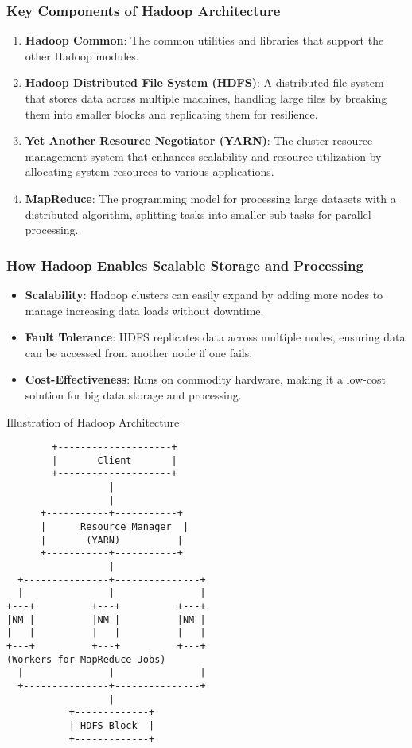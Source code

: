 \documentclass[aspectratio=169]{beamer}
\begin{document}
\begin{frame}[fragile]
    \frametitle{Key Components of Hadoop Architecture}
    \begin{enumerate}
        \item \textbf{Hadoop Common}: The common utilities and libraries that support the other Hadoop modules.
        \item \textbf{Hadoop Distributed File System (HDFS)}: A distributed file system that stores data across multiple machines, handling large files by breaking them into smaller blocks and replicating them for resilience.
        \item \textbf{Yet Another Resource Negotiator (YARN)}: The cluster resource management system that enhances scalability and resource utilization by allocating system resources to various applications.
        \item \textbf{MapReduce}: The programming model for processing large datasets with a distributed algorithm, splitting tasks into smaller sub-tasks for parallel processing.
    \end{enumerate}
\end{frame}

\begin{frame}[fragile]
    \frametitle{How Hadoop Enables Scalable Storage and Processing}
    \begin{itemize}
        \item \textbf{Scalability}: Hadoop clusters can easily expand by adding more nodes to manage increasing data loads without downtime.
        \item \textbf{Fault Tolerance}: HDFS replicates data across multiple nodes, ensuring data can be accessed from another node if one fails.
        \item \textbf{Cost-Effectiveness}: Runs on commodity hardware, making it a low-cost solution for big data storage and processing.
    \end{itemize}
    
    \begin{block}{Illustration of Hadoop Architecture}
    \begin{verbatim}
        +--------------------+
        |       Client       |
        +--------------------+
                  |
                  |
      +-----------+-----------+
      |      Resource Manager  | 
      |       (YARN)          |
      +-----------+-----------+
                  |
  +---------------+---------------+
  |               |               |
+---+          +---+          +---+ 
|NM |          |NM |          |NM |
|   |          |   |          |   |
+---+          +---+          +---+
(Workers for MapReduce Jobs)
  |               |               |
  +---------------+---------------+
                  |
           +-------------+
           | HDFS Block  |
           +-------------+
    \end{verbatim}
    \end{block}
\end{frame}
\end{document}
